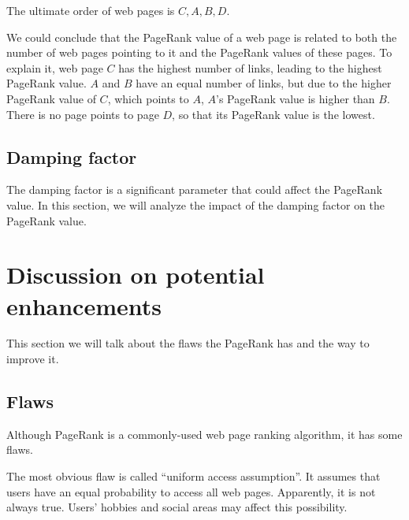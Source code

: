 \documentclass[lettersize,journal,12pt,conference]{IEEEtran}
\begin{document}
The ultimate order of web pages is $C, A, B, D$. 

We could conclude that the PageRank value of a web page is related to both the number of web pages pointing to it and the PageRank values of these pages. To explain it, web page $C$ has the highest number of links, leading to the highest PageRank value. $A$ and $B$ have an equal number of links, but due to the higher PageRank value of $C$, which points to $A$, $A$'s PageRank value is higher than $B$. There is no page points to page $D$, so that its PageRank value is the lowest.

\subsection{Damping factor}

The damping factor is a significant parameter that could affect the PageRank value. In this section, we will analyze the impact of the damping factor on the PageRank value.



\section{Discussion on potential enhancements}

This section we will talk about the flaws the PageRank has and the way to improve it.
\subsection{Flaws}

Although PageRank is a commonly-used web page ranking algorithm, it has some flaws.

The most obvious flaw is called ``uniform access assumption''. It assumes that users have an equal probability to access all web pages. Apparently, it is not always true. Users' hobbies and social areas may affect this possibility.
\end{document}
